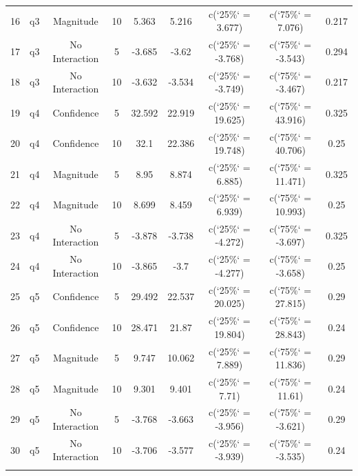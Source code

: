 \begin{table}[!htbp]
\begin{tabular}{@{\extracolsep{5pt}} ccccccccc}
16 & q3 & Magnitude & 10 & 5.363 & 5.216 & c(`25\%` = 3.677) & c(`75\%` = 7.076) & 0.217 \\ 
17 & q3 & No Interaction & 5 & -3.685 & -3.62 & c(`25\%` = -3.768) & c(`75\%` = -3.543) & 0.294 \\ 
18 & q3 & No Interaction & 10 & -3.632 & -3.534 & c(`25\%` = -3.749) & c(`75\%` = -3.467) & 0.217 \\ 
19 & q4 & Confidence & 5 & 32.592 & 22.919 & c(`25\%` = 19.625) & c(`75\%` = 43.916) & 0.325 \\ 
20 & q4 & Confidence & 10 & 32.1 & 22.386 & c(`25\%` = 19.748) & c(`75\%` = 40.706) & 0.25 \\ 
21 & q4 & Magnitude & 5 & 8.95 & 8.874 & c(`25\%` = 6.885) & c(`75\%` = 11.471) & 0.325 \\ 
22 & q4 & Magnitude & 10 & 8.699 & 8.459 & c(`25\%` = 6.939) & c(`75\%` = 10.993) & 0.25 \\ 
23 & q4 & No Interaction & 5 & -3.878 & -3.738 & c(`25\%` = -4.272) & c(`75\%` = -3.697) & 0.325 \\ 
24 & q4 & No Interaction & 10 & -3.865 & -3.7 & c(`25\%` = -4.277) & c(`75\%` = -3.658) & 0.25 \\ 
25 & q5 & Confidence & 5 & 29.492 & 22.537 & c(`25\%` = 20.025) & c(`75\%` = 27.815) & 0.29 \\ 
26 & q5 & Confidence & 10 & 28.471 & 21.87 & c(`25\%` = 19.804) & c(`75\%` = 28.843) & 0.24 \\ 
27 & q5 & Magnitude & 5 & 9.747 & 10.062 & c(`25\%` = 7.889) & c(`75\%` = 11.836) & 0.29 \\ 
28 & q5 & Magnitude & 10 & 9.301 & 9.401 & c(`25\%` = 7.71) & c(`75\%` = 11.61) & 0.24 \\ 
29 & q5 & No Interaction & 5 & -3.768 & -3.663 & c(`25\%` = -3.956) & c(`75\%` = -3.621) & 0.29 \\ 
30 & q5 & No Interaction & 10 & -3.706 & -3.577 & c(`25\%` = -3.939) & c(`75\%` = -3.535) & 0.24 \\ 
\hline \\[-1.8ex] 
\end{tabular} 
\end{table} 
